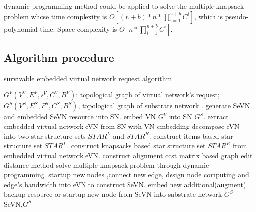dynamic programming method  could be applied to solve the multiple knapsack problem whose time complexity is $O[(n+b)*n*\prod_{i=1}^{n+b}C^i]$, which is pseudo-polynomial time. Space complexity is $O[n*\prod_{i=1}^{n+b}C^i]$.


\subsection{Algorithm procedure}

\begin{algorithm}
\caption{survivable embedded virtual network request algorithm}
\label{alg:SeVNAlg}
\begin{algorithmic}[1]
\REQUIRE $G^V (V^V,E^V,s^V,C^V,B^V)$:  topological graph of virtual network's request; $G^S (V^S,E^S,F^S,C^S,B^S)$, topological graph of substrate network .
\ENSURE generate SeVN and embedded SeVN resource into SN.
\STATE embed VN $G^V$ into SN $G^S$.
\STATE extract embedded virtual network eVN from SN with VN embedding
\STATE decompose eVN into two star structure sets $STAR^L$ and $STAR^R$.
\STATE construct items based star structure set $STAR^L$.
\STATE construct knapsacks based star structure set $STAR^R$ from embedded virtual network eVN.
\STATE construct alignment cost matrix based graph edit distance method\cite{sanfeliu1983distance}
\STATE solve multiple knapsack problem through dynamic programming.
\STATE startup new nodes ,connect new edge, design node computing and edge's bandwidth into eVN to construct SeVN.
\STATE embed new additional(augment) backup resource or startup new node from SeVN into substrate network $G^S$
\ENDFOR
\RETURN SeVN,$G^S$
\end{algorithmic}
\end{algorithm}




